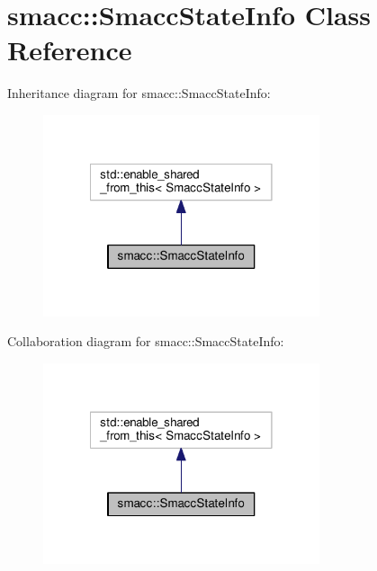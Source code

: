 \hypertarget{classsmacc_1_1SmaccStateInfo}{\section{smacc\-:\-:Smacc\-State\-Info Class Reference}
\label{classsmacc_1_1SmaccStateInfo}
}


Inheritance diagram for smacc\-:\-:Smacc\-State\-Info\-:
\nopagebreak
\begin{figure}[H]
\begin{center}
\leavevmode
\includegraphics[width=230pt]{classsmacc_1_1SmaccStateInfo__inherit__graph}
\end{center}
\end{figure}


Collaboration diagram for smacc\-:\-:Smacc\-State\-Info\-:
\nopagebreak
\begin{figure}[H]
\begin{center}
\leavevmode
\includegraphics[width=230pt]{classsmacc_1_1SmaccStateInfo__coll__graph}
\end{center}
\end{figure}
